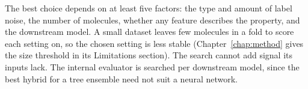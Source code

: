 The best choice depends on at least five factors: the type and amount of label noise, the number of molecules, whether any feature describes the property, and the downstream model. A small dataset leaves few molecules in a fold to score each setting on, so the chosen setting is less stable (Chapter~\ref{chap:method} gives the size threshold in its Limitations section). The search cannot add signal its inputs lack. The internal evaluator is searched per downstream model, since the best hybrid for a tree ensemble need not suit a neural network.

